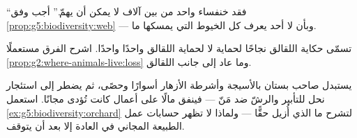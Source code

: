 \begin{exercise}[$\star\star$]\label{exo:g5:biodiversity:9}
``فقد  خنفساء واحد من بين آلاف لا يمكن أن يهمّ.'' أجب وفق
\cref{prop:g5:biodiversity:web} --- وبأن لا أحد يعرف كل الخيوط
التي يمسكها  ما.
\end{exercise}

\begin{exercise}[$\star\star$]\label{exo:g5:biodiversity:10}
تسمّى حكاية اللقالق نجاحًا لحماية \emph{} لا لحماية اللقالق
واحدًا واحدًا. اشرح الفرق مستعملًا
\cref{prop:g2:where-animals-live:loss} وما عاد إلى جانب اللقالق.
\end{exercise}

\begin{exercise}[$\star\star\star$]\label{exo:g5:biodiversity:11}
يستبدل صاحب بستان بالأسيجة وأشرطة الأزهار أسوارًا وحصًى، ثم يضطر
إلى استئجار  نحل للتأبير والرشّ ضد مَنّ  --- فينفق مالًا
على أعمال كانت تُؤدى مجانًا. استعمل \cref{ex:g5:biodiversity:orchard}
لتشرح ما الذي أُزيل حقًّا --- ولماذا لا تظهر حسابات عمل الطبيعة
المجاني في العادة إلا بعد أن يتوقف.
\end{exercise}
